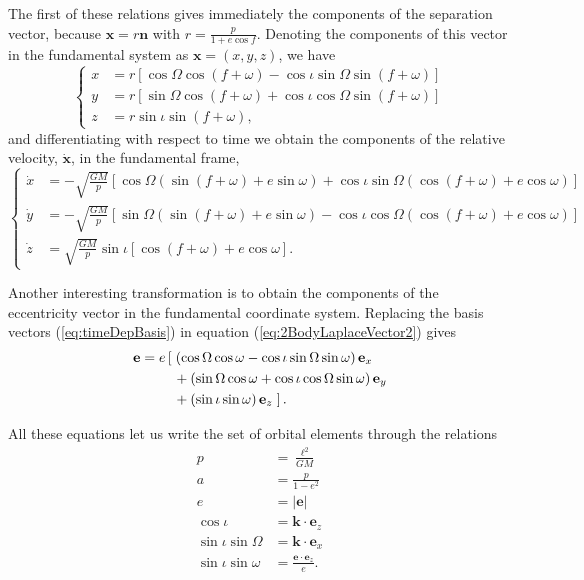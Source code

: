 The first of these relations gives immediately the components of the separation vector, because $\textbf{x} = r \textbf{n}$ with $r = \frac{p}{1+e\cos f}$. Denoting the components of this vector in the fundamental system as $\textbf{x} = (x,y,z)$, we have 
 \begin{equation}
 \begin{cases}
 x &= r \left[ \cos \Omega \cos (f + \omega) - \cos \iota \sin \Omega \sin (f + \omega) \right] \\
 y &= r \left[ \sin \Omega \cos (f + \omega) + \cos \iota \cos \Omega \sin (f + \omega) \right] \\
 z &= r \sin \iota \sin (f + \omega),
 \end{cases}
 \end{equation}
and differentiating with respect to time we obtain the components of the relative  velocity, $\dot{\textbf{x}}$, in the fundamental frame,
\begin{equation}
 \begin{cases}
 \dot{x} &= -\sqrt{\frac{GM}{p}} \left[ \cos \Omega \left( \sin (f + \omega) + e \sin \omega \right) + \cos \iota \sin \Omega \left ( \cos (f + \omega) + e \cos \omega \right) \right] \\
 \dot{y} &= -\sqrt{\frac{GM}{p}}  \left[ \sin \Omega \left( \sin (f + \omega) + e \sin \omega \right) - \cos \iota \cos \Omega \left ( \cos (f + \omega) + e \cos \omega \right) \right]\\
 \dot{z} &= \sqrt{\frac{GM}{p}}  \sin \iota \left[ \cos (f + \omega) + e \cos \omega \right].
 \end{cases}
 \end{equation}

Another interesting transformation is to obtain the components of the eccentricity vector in the fundamental coordinate system. Replacing the basis vectors (\ref{eq:timeDepBasis}) in equation (\ref{eq:2BodyLaplaceVector2}) gives
 \begin{align}
\textbf{e} = e \left[ \right.& \left( \cos \Omega \cos \omega - \cos \iota \sin \Omega \sin \omega \right) \textbf{e}_x \notag \\
& + \left( \sin \Omega \cos \omega + \cos \iota \cos \Omega \sin \omega \right)\textbf{e}_y \notag \\
& + \left( \sin \iota \sin \omega \right) \textbf{e}_z \left. \right].
 \end{align} 
 
 All these equations let us write the set of orbital elements through the relations
 \begin{subequations}\label{eq:2BodyOrbitalElements}
 \begin{align}
 p &= \frac{\ell^2}{GM} \\
 a &= \frac{p}{1-e^2} \\
 e &= \left| \textbf{e} \right| \\
 \cos \iota &= \textbf{k} \cdot \textbf{e}_z \\
 \sin \iota \sin \Omega &= \textbf{k} \cdot \textbf{e}_x \\
 \sin \iota \sin \omega &= \frac{\textbf{e} \cdot \textbf{e}_z}{e} .
 \end{align}
 \end{subequations}

